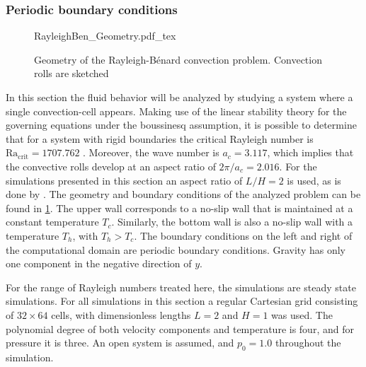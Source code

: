 \subsubsection{Periodic boundary conditions}\label{ssec:SingleCellConv}
\begin{figure}[bt]
	\begin{center}
		\def\svgwidth{0.83\textwidth}
		{RayleighBen_Geometry.pdf_tex}
		\caption{Geometry of the Rayleigh-Bénard convection problem. Convection rolls are sketched}
		\label{fig:RayBenGeometryPeriodic}
	\end{center}
\end{figure}
In this section the fluid behavior will be analyzed by studying a system where a single convection-cell appears. Making use of the linear stability theory for the governing equations under the boussinesq assumption, it is possible to determine that for a system with rigid boundaries the critical Rayleigh number is $\text{Ra}_{\text{crit}} = 1707.762$ \citep{chandrasekharHydrodynamicHydromagneticStability1961}.  Moreover, the wave number is $a_c =3.117$, which implies that the convective rolls develop at an aspect ratio of $2 \pi/a_c = 2.016$. For the simulations presented in this section an aspect ratio of $L/H = 2$ is used, as is done by \cite{kaoSimulatingOscillatoryFlows2007}. The geometry and boundary conditions of the analyzed problem can be found in \cref{fig:RayBenGeometryPeriodic}. The upper wall corresponds to a no-slip wall that is maintained at a constant temperature $T_c$. Similarly, the bottom wall is also a no-slip wall with a temperature $T_h$, with $T_h > T_c$. The boundary conditions on the left and right of the computational domain are periodic boundary conditions. Gravity has only one component in the negative direction of $y$. %

For the range of Rayleigh numbers treated here, the simulations are steady state simulations. For all simulations in this section a regular Cartesian grid consisting of $32\times64$ cells, with dimensionless lengths $L = 2$ and $H = 1$ was used. The polynomial degree of both velocity components and temperature is four, and for pressure it is three. An open system is assumed, and $p_0 = 1.0$ throughout the simulation.


